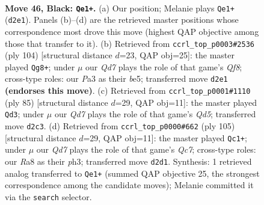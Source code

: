 \documentclass[11pt]{article}
\begin{document}
\clearpage

\begin{figure}[p]\centering
\begin{subfigure}{0.46\textwidth}\centering
\resizebox{\linewidth}{!}{%
\newchessgame
\chessboard[
  setfen={r7/1Q6/4kp2/3p4/5P2/p5P1/P2q3P/6K1 b - - 12 46},
  showmover=false,
  pgfstyle=straightmove, color=movearrow, markmove={d2-e1}
]}
\caption{}
\end{subfigure}\hfill
\begin{subfigure}{0.46\textwidth}\centering
\resizebox{\linewidth}{!}{%
\newchessgame
\chessboard[
  setfen={5Q2/8/4p1kp/4bp2/4p3/PR4PP/q7/7K w - - 18 53},
  showmover=false,
  pgfstyle=straightmove, color=movearrow, markmove={f8-g8}
]}
\caption{}
\end{subfigure}
\\[4pt]
\begin{subfigure}{0.46\textwidth}\centering
\resizebox{\linewidth}{!}{%
\newchessgame
\chessboard[
  setfen={8/6pk/4Q2p/3p4/3q3P/6P1/5PK1/8 b - - 0 43},
  showmover=false,
  pgfstyle=straightmove, color=movearrow, markmove={d4-d3}
]}
\caption{}
\end{subfigure}\hfill
\begin{subfigure}{0.46\textwidth}\centering
\resizebox{\linewidth}{!}{%
\newchessgame
\chessboard[
  setfen={8/1Q6/p2kp3/2p2p2/8/1P4PP/2q2P2/4K3 b - - 5 53},
  showmover=false,
  pgfstyle=straightmove, color=movearrow, markmove={c2-c1}
]}
\caption{}
\end{subfigure}
\caption{\textbf{Move 46, Black: \texttt{Qe1+}.} (a) Our position; Melanie plays \texttt{Qe1+} (\texttt{d2e1}). Panels (b)--(d) are the retrieved master positions whose correspondence most drove this move (highest QAP objective among those that transfer to it). (b) Retrieved from \texttt{ccrl\_top\_p0003\#2536} (ply 104) [structural distance $d$=23, QAP obj=25]: the master played \texttt{Qg8+}; under $\mu$ our \emph{Qd7} plays the role of that game's \emph{Qf8}; cross-type roles: our \emph{P}a3 as their \emph{b}e5; transferred move \texttt{d2e1} \textbf{(endorses this move)}. (c) Retrieved from \texttt{ccrl\_top\_p0001\#1110} (ply 85) [structural distance $d$=29, QAP obj=11]: the master played \texttt{Qd3}; under $\mu$ our \emph{Qd7} plays the role of that game's \emph{Qd5}; transferred move \texttt{d2c3}. (d) Retrieved from \texttt{ccrl\_top\_p0000\#662} (ply 105) [structural distance $d$=29, QAP obj=11]: the master played \texttt{Qc1+}; under $\mu$ our \emph{Qd7} plays the role of that game's \emph{Qc7}; cross-type roles: our \emph{R}a8 as their \emph{p}h3; transferred move \texttt{d2d1}. Synthesis: 1 retrieved analog transferred to \texttt{Qe1+} (summed QAP objective 25, the strongest correspondence among the candidate moves); Melanie committed it via the \texttt{search} selector.}
\label{fig:thought-m91}
\end{figure}
\end{document}
